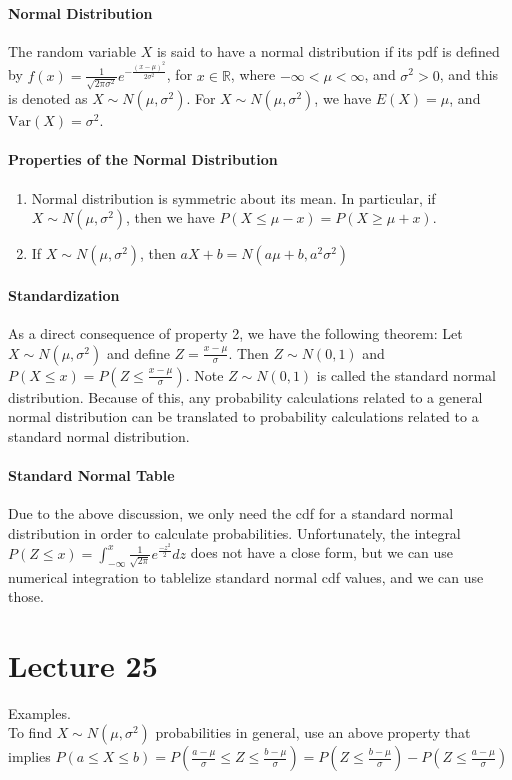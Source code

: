 \documentclass[10pt,letter]{article}
\begin{document}
\paragraph{Normal Distribution}
The random variable $X$ is said to have a normal distribution if its pdf is defined by $f(x)=\frac{1}{\sqrt{2\pi\sigma^2}}e^{-\frac{(x-\mu)^2}{2\sigma^2}}$, for $x\in\mathbb{R}$, where $-\infty<\mu<\infty$, and $\sigma^2>0$, and this is denoted as $X\sim N(\mu,\sigma^2)$. For $X\sim N(\mu,\sigma^2)$, we have $E(X)=\mu$, and $\text{Var}(X)=\sigma^2$. 
\paragraph{Properties of the Normal Distribution}
\begin{enumerate}
    \item Normal distribution is symmetric about its mean. In particular, if $X\sim N(\mu,\sigma^2)$, then we have $P(X\leq \mu-x)=P(X\geq \mu+x)$. 
    \item If $X\sim N(\mu,\sigma^2)$, then $aX+b=N(a\mu+b,a^2\sigma^2)$
\end{enumerate}
\paragraph{Standardization}
As a direct consequence of property 2, we have the following theorem: Let $X\sim N(\mu,\sigma^2)$ and define $Z=\frac{x-\mu}{\sigma}$. Then $Z\sim N(0,1)$ and $P(X\leq x)=P(Z\leq \frac{x-\mu}{\sigma})$. Note $Z\sim N(0,1)$ is called the standard normal distribution. Because of this, any probability calculations related to a general normal distribution can be translated to probability calculations related to a standard normal distribution. 
\paragraph{Standard Normal Table}
Due to the above discussion, we only need the cdf for a standard normal distribution in order to calculate probabilities. Unfortunately, the integral $P(Z\leq x)=\int_{-\infty}^x\frac{1}{\sqrt{2\pi}}e^\frac{-z^2}{2}dz$ does not have a close form, but we can use numerical integration to tablelize standard normal cdf values, and we can use those. 

\section*{Lecture 25}
Examples.  \\ 
To find $X\sim N(\mu,\sigma^2)$ probabilities in general, use an above property that implies $P(a\leq X\leq b)=P\left(\frac{a-\mu}{\sigma}\leq Z\leq\frac{b-\mu}{\sigma}\right)=P\left(Z\leq\frac{b-\mu}{\sigma}\right)-P\left(Z\leq\frac{a-\mu}{\sigma}\right)$
\end{document}
